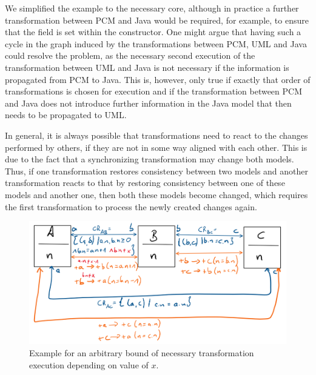 We simplified the example to the necessary core, although in practice a further transformation between \gls{PCM} and Java would be required, for example, to ensure that the field is set within the constructor.
One might argue that having such a cycle in the graph induced by the transformations between \gls{PCM}, UML and Java could resolve the problem, as the necessary second execution of the transformation between UML and Java is not necessary if the information is propagated from \gls{PCM} to Java.
This is, however, only true if exactly that order of transformations is chosen for execution and if the transformation between \gls{PCM} and Java does not introduce further information in the Java model that then needs to be propagated to UML.

In general, it is always possible that transformations need to react to the changes performed by others, if they are not in some way aligned with each other.
This is due to the fact that a synchronizing transformation may change both models.
Thus, if one transformation restores consistency between two models and another transformation reacts to that by restoring consistency between one of these models and another one, then both these models become changed, which requires the first transformation to process the newly created changes again.

\begin{figure}
    \centering
    \includegraphics[width=\textwidth]{figures/correctness/orchestration/no_upper_bound_example.png}
    \caption[Example for arbitrary bounds of transformation execution]{Example for an arbitrary bound of necessary transformation execution depending on value of $x$.}
    \label{fig:orchestration:no_upper_bound}
\end{figure}

